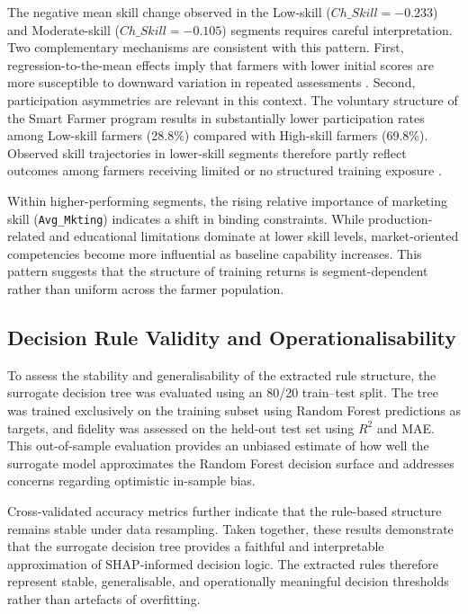 \documentclass[3p,twocolumn,authoryear]{elsarticle}
\begin{document}
The negative mean skill change observed in the Low-skill
($Ch\_Skill = -0.233$) and Moderate-skill
($Ch\_Skill = -0.105$) segments requires careful interpretation.
Two complementary mechanisms are consistent with this pattern.
First, regression-to-the-mean effects imply that farmers with lower
initial scores are more susceptible to downward variation in repeated
assessments \citep{davis2012}.
Second, participation asymmetries are relevant in this context.
The voluntary structure of the Smart Farmer program results in
substantially lower participation rates among Low-skill farmers
(28.8\%) compared with High-skill farmers (69.8\%).
Observed skill trajectories in lower-skill segments therefore partly
reflect outcomes among farmers receiving limited or no structured
training exposure \citep{anderson2004}.

Within higher-performing segments, the rising relative importance of
marketing skill (\texttt{Avg\_Mkting}) indicates a shift in binding
constraints.
While production-related and educational limitations dominate at lower
skill levels, market-oriented competencies become more influential as
baseline capability increases.
This pattern suggests that the structure of training returns is
segment-dependent rather than uniform across the farmer population.

\subsection{Decision Rule Validity and Operationalisability}

To assess the stability and generalisability of the extracted rule
structure, the surrogate decision tree was evaluated using an 80/20
train--test split.
The tree was trained exclusively on the training subset using Random
Forest predictions as targets, and fidelity was assessed on the held-out
test set using $R^{2}$ and MAE.
This out-of-sample evaluation provides an unbiased estimate of how well
the surrogate model approximates the Random Forest decision surface and
addresses concerns regarding optimistic in-sample bias.

Cross-validated accuracy metrics further indicate that the rule-based
structure remains stable under data resampling.
Taken together, these results demonstrate that the surrogate decision
tree provides a faithful and interpretable approximation of SHAP-informed
decision logic.
The extracted rules therefore represent stable, generalisable, and
operationally meaningful decision thresholds rather than artefacts of
overfitting.
\end{document}
